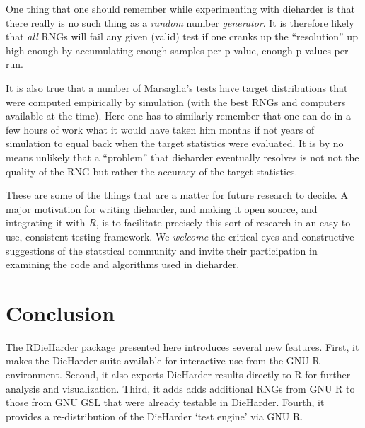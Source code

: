 \documentclass[12pt]{article}
\newcommand{\pkg}[1]{{\normalfont\fontseries{b}\selectfont #1}}
\begin{document}
One thing that one should remember while experimenting with dieharder is
that there really is no such thing as a {\em random} number {\em
generator}.  It is therefore likely that {\em all} RNGs will fail any
given (valid) test if one cranks up the ``resolution'' up high enough by
accumulating enough samples per p-value, enough p-values per run.  

It is also true that a number of Marsaglia's tests have target
distributions that were computed empirically by simulation (with the
best RNGs and computers available at the time).  Here one has to
similarly remember that one can do in a few hours of work what it would
have taken him months if not years of simulation to equal back when the
target statistics were evaluated.  It is by no means unlikely that a
``problem'' that dieharder eventually resolves is not not the quality of
the RNG but rather the accuracy of the target statistics.

These are some of the things that are a matter for future research
to decide.  A major motivation for writing dieharder, and making it open
source, and integrating it with $R$, is to facilitate precisely this
sort of research in an easy to use, consistent testing framework.  We
{\em welcome} the critical eyes and constructive suggestions of the
statstical community and invite their participation in examining the
code and algorithms used in dieharder.

\section{Conclusion}

The \pkg{RDieHarder} package presented here introduces several new features.
First, it makes the DieHarder suite \citep{Brown:dieharder:2007} available
for interactive use from the GNU R environment. Second, it also exports
DieHarder results directly to R for further analysis and visualization.
Third, it adds adds additional RNGs from GNU R to those from GNU GSL that
were already testable in DieHarder. Fourth, it provides a re-distribution of
the DieHarder `test engine' via GNU R.



\end{document}
